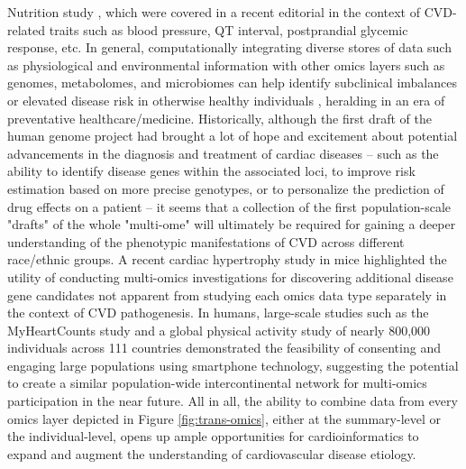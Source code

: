 \documentclass[letter]{bib}
\begin{document}
Nutrition study \citep{Zeevi:2015:Personalized}, which were covered in a recent editorial \citep{Lau:2018:Omics} in the context of CVD-related traits such as blood pressure, QT interval, postprandial glycemic response, etc.  In general, computationally integrating diverse stores of data such as physiological and environmental information with other omics layers such as genomes, metabolomes, and microbiomes can help identify subclinical imbalances or elevated disease risk in otherwise healthy individuals \citep{Lau:2018:Omics}, heralding in an era of preventative healthcare/medicine.  Historically, although the first draft of the human genome project had brought a lot of hope and excitement about potential advancements in the diagnosis and treatment of cardiac diseases -- such as the ability to identify disease genes within the associated loci, to improve risk estimation based on more precise genotypes, or to personalize the prediction of drug effects on a patient \citep{Komajda:2001:heart} -- it seems that a collection of the first population-scale "drafts" of the whole "multi-ome" will ultimately be required for gaining a deeper understanding of the phenotypic manifestations of CVD across different race/ethnic groups.  A recent cardiac hypertrophy study in mice \citep{Lau:2018:integrated} highlighted the utility of conducting multi-omics investigations for discovering additional disease gene candidates not apparent from studying each omics data type separately in the context of CVD pathogenesis.  In humans, large-scale studies such as the MyHeartCounts study \citep{McConnell:2017:Feasibility} and a global physical activity study of nearly 800,000 individuals across 111 countries \citep{Althoff:2017:Large} demonstrated the feasibility of consenting and engaging large populations using smartphone technology, suggesting the potential to create a similar population-wide intercontinental network for multi-omics participation in the near future.  All in all, the ability to combine data from every omics layer depicted in Figure \ref{fig:trans-omics}, either at the summary-level or the individual-level, opens up ample opportunities for cardioinformatics to expand and augment the understanding of cardiovascular disease etiology.
	
	
\end{document}
